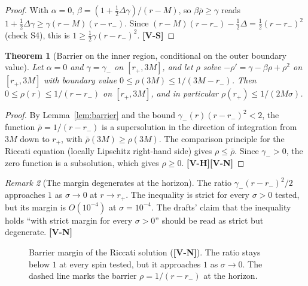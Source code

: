 \documentclass[11pt, a4paper]{article}
\newcommand{\VS}{\textcolor{vs}{\textbf{[V-S]}}}
\newcommand{\VN}{\textcolor{vn}{\textbf{[V-N]}}}
\newcommand{\VH}{\textcolor{vh}{\textbf{[V-H]}}}
\newtheorem{theorem}{Theorem}[section]
\theoremstyle{remark}
\newtheorem{remark}[theorem]{Remark}
\theoremstyle{definition}
\begin{document}
\begin{proof}
With $\alpha = 0$, $\beta = (1 + \tfrac12\Delta\gamma)/(r-M)$, so $\beta\bar\rho \ge \gamma$ reads $1 + \tfrac12\Delta\gamma \ge \gamma(r-M)(r-r_-)$. Since $(r-M)(r-r_-) - \tfrac12\Delta = \tfrac12(r-r_-)^2$ (check S4), this is $1 \ge \tfrac12\gamma(r-r_-)^2$. \VS
\end{proof}

\begin{theorem}[Barrier on the inner region, conditional on the outer boundary value]
\label{thm:barrier}
Let $\alpha = 0$ and $\gamma = \gamma_-$ on $[r_+, 3M]$, and let $\rho$ solve $-\rho' = \gamma - \beta\rho + \rho^2$ on $[r_+,3M]$ with boundary value $0 \le \rho(3M) \le 1/(3M - r_-)$. Then $0 \le \rho(r) \le 1/(r-r_-)$ on $[r_+,3M]$, and in particular $\rho(r_+) \le 1/(2M\sigma)$.
\end{theorem}

\begin{proof}
By Lemma~\ref{lem:barrier} and the bound $\gamma_-(r)(r-r_-)^2 < 2$, the function $\bar\rho = 1/(r-r_-)$ is a supersolution in the direction of integration from $3M$ down to $r_+$, with $\bar\rho(3M)\ge\rho(3M)$. The comparison principle for the Riccati equation (locally Lipschitz right-hand side) gives $\rho\le\bar\rho$. Since $\gamma_-> 0$, the zero function is a subsolution, which gives $\rho \ge 0$. \VH\VN
\end{proof}

\begin{remark}[The margin degenerates at the horizon]
The ratio $\gamma_-(r-r_-)^2/2$ approaches $1$ as $\sigma\to0$ at $r\to r_+$. The inequality is strict for every $\sigma>0$ tested, but its margin is $O(10^{-4})$ at $\sigma = 10^{-4}$. The drafts' claim that the inequality holds ``with strict margin for every $\sigma>0$'' should be read as strict but degenerate. \VN
\end{remark}

\begin{figure}[H]
\centering
{}
\caption{Barrier margin of the Riccati solution (\VN). The ratio stays below $1$ at every spin tested, but it approaches $1$ as $\sigma\to 0$. The dashed line marks the barrier $\rho = 1/(r-r_-)$ at the horizon.}
\label{fig:margin}
\end{figure}
\end{document}
